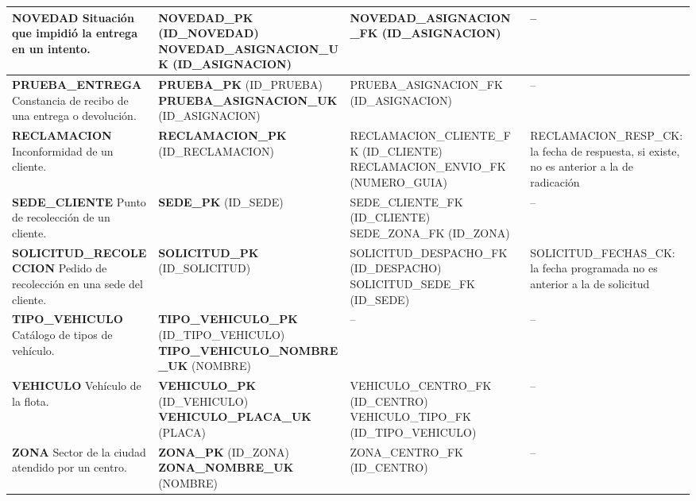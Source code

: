 {\begin{longtable}{|L{3.0cm}|L{3.9cm}|L{3.8cm}|L{3.6cm}|}
\textbf{NOVEDAD} \newline Situación que impidió la entrega en un intento. & \textbf{NOVEDAD\_PK} (ID\_NOVEDAD) \newline \textbf{NOVEDAD\_ASIGNACION\_UK} (ID\_ASIGNACION) & NOVEDAD\_ASIGNACION\_FK (ID\_ASIGNACION) & -- \\ \hline
\textbf{PRUEBA\_ENTREGA} \newline Constancia de recibo de una entrega o devolución. & \textbf{PRUEBA\_PK} (ID\_PRUEBA) \newline \textbf{PRUEBA\_ASIGNACION\_UK} (ID\_ASIGNACION) & PRUEBA\_ASIGNACION\_FK (ID\_ASIGNACION) & -- \\ \hline
\textbf{RECLAMACION} \newline Inconformidad de un cliente. & \textbf{RECLAMACION\_PK} (ID\_RECLAMACION) & RECLAMACION\_CLIENTE\_FK (ID\_CLIENTE) \newline RECLAMACION\_ENVIO\_FK (NUMERO\_GUIA) & RECLAMACION\_RESP\_CK: la fecha de respuesta, si existe, no es anterior a la de radicación \\ \hline
\textbf{SEDE\_CLIENTE} \newline Punto de recolección de un cliente. & \textbf{SEDE\_PK} (ID\_SEDE) & SEDE\_CLIENTE\_FK (ID\_CLIENTE) \newline SEDE\_ZONA\_FK (ID\_ZONA) & -- \\ \hline
\textbf{SOLICITUD\_RECOLECCION} \newline Pedido de recolección en una sede del cliente. & \textbf{SOLICITUD\_PK} (ID\_SOLICITUD) & SOLICITUD\_DESPACHO\_FK (ID\_DESPACHO) \newline SOLICITUD\_SEDE\_FK (ID\_SEDE) & SOLICITUD\_FECHAS\_CK: la fecha programada no es anterior a la de solicitud \\ \hline
\textbf{TIPO\_VEHICULO} \newline Catálogo de tipos de vehículo. & \textbf{TIPO\_VEHICULO\_PK} (ID\_TIPO\_VEHICULO) \newline \textbf{TIPO\_VEHICULO\_NOMBRE\_UK} (NOMBRE) & -- & -- \\ \hline
\textbf{VEHICULO} \newline Vehículo de la flota. & \textbf{VEHICULO\_PK} (ID\_VEHICULO) \newline \textbf{VEHICULO\_PLACA\_UK} (PLACA) & VEHICULO\_CENTRO\_FK (ID\_CENTRO) \newline VEHICULO\_TIPO\_FK (ID\_TIPO\_VEHICULO) & -- \\ \hline
\textbf{ZONA} \newline Sector de la ciudad atendido por un centro. & \textbf{ZONA\_PK} (ID\_ZONA) \newline \textbf{ZONA\_NOMBRE\_UK} (NOMBRE) & ZONA\_CENTRO\_FK (ID\_CENTRO) & -- \\ \hline
\end{longtable}
}
